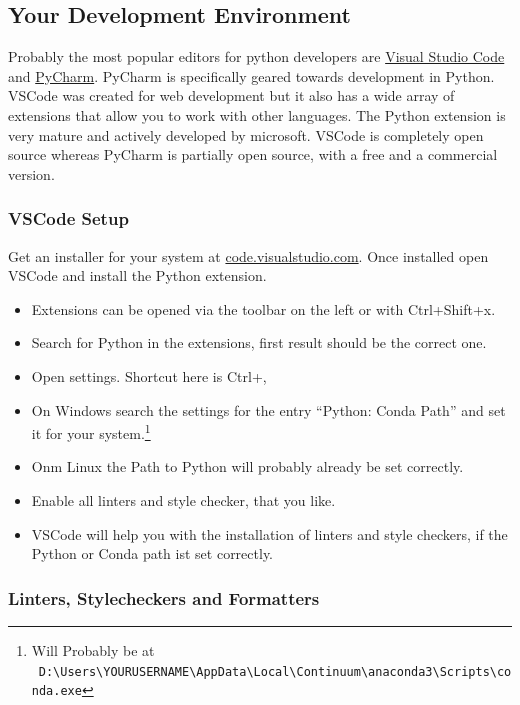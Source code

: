 \documentclass{article}
\begin{document}
\subsection{Your Development Environment}

Probably the most popular editors for python developers are
\href{https://code.visualstudio.com/}{Visual Studio Code}
and \href{https://www.jetbrains.com/pycharm/}{PyCharm}.
PyCharm is specifically geared towards development in Python.
VSCode was created for web development but it also has a wide array of
extensions that allow you to work with other languages.
The Python extension is very mature and actively developed by microsoft.
VSCode is completely open source whereas PyCharm is partially open source, with
a free and a commercial version.

\subsubsection{VSCode Setup}

Get an installer for your system at
\href{https://code.visualstudio.com/}{code.visualstudio.com}.
Once installed open VSCode and install the Python extension.
\begin{itemize}
    \item Extensions can be opened via the toolbar on the left or with Ctrl+Shift+x.
    \item Search for Python in the extensions, first result should be the correct one.
    \item Open settings. Shortcut here is Ctrl+,
    \item On Windows search the settings for the entry
          ``Python: Conda Path'' and set it for your system.\footnote{Will Probably be at\\ \
              \verb!D:\Users\YOURUSERNAME\AppData\Local\Continuum\anaconda3\Scripts\conda.exe! }
    \item Onm Linux the Path to Python will probably already be set correctly.
    \item Enable all linters and style checker, that you like.
    \item VSCode will help you with the installation of linters and style checkers,
          if the Python or Conda path ist set correctly.
\end{itemize}

\subsubsection{Linters, Stylecheckers and Formatters}
\end{document}
